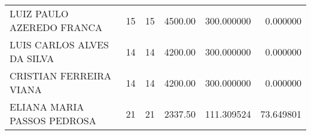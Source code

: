 \begin{tabular}{lrrrrr}
                         LUIZ PAULO AZEREDO FRANCA &                    15 &                   15 &      4500.00 &   300.000000 &                  0.000000 \\
                        LUIS CARLOS ALVES DA SILVA &                    14 &                   14 &      4200.00 &   300.000000 &                  0.000000 \\
                           CRISTIAN FERREIRA VIANA &                    14 &                   14 &      4200.00 &   300.000000 &                  0.000000 \\
                       ELIANA MARIA PASSOS PEDROSA &                    21 &                   21 &      2337.50 &   111.309524 &                 73.649801 \\
\bottomrule
\end{tabular}
